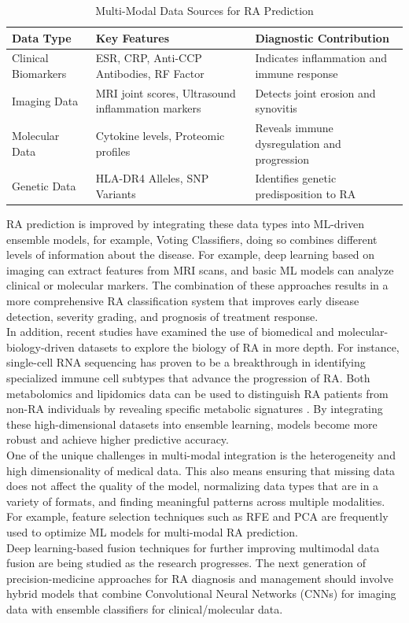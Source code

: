 \documentclass[10pt]{NSP1}
\begin{document}
	\begin{table}[H]
		\centering
		\caption{Multi-Modal Data Sources for RA Prediction}
		\renewcommand{\arraystretch}{1.2}
		\begin{tabular}{p{2.2cm}p{3cm}p{2.3cm}}
			\toprule
			\textbf{Data Type} & \textbf{Key Features} & \textbf{Diagnostic Contribution} \\
			\midrule
			Clinical Biomarkers & ESR, CRP, Anti-CCP Antibodies, RF Factor & Indicates inflammation and immune response \\
			Imaging Data & MRI joint scores, Ultrasound inflammation markers & Detects joint erosion and synovitis \\
			Molecular Data & Cytokine levels, Proteomic profiles & Reveals immune dysregulation and progression \\
			Genetic Data & HLA-DR4 Alleles, SNP Variants & Identifies genetic predisposition to RA \\
			\bottomrule
		\end{tabular}
		\label{tab:multimodal}
	\end{table}
	
	\noindent RA prediction is improved by integrating these data types into ML-driven ensemble models, for example, Voting Classifiers, doing so combines different levels of information about the disease. For example, deep learning based on imaging can extract features from MRI scans, and basic ML models can analyze clinical or molecular markers. The combination of these approaches results in a more comprehensive RA classification system that improves early disease detection, severity grading, and prognosis of treatment response.\\
	In addition, recent studies have examined the use of biomedical and molecular-biology-driven datasets to explore the biology of RA in more depth. For instance, single-cell RNA sequencing has proven to be a breakthrough in identifying specialized immune cell subtypes that advance the progression of RA. Both metabolomics and lipidomics data can be used to distinguish RA patients from non-RA individuals by revealing specific metabolic signatures \cite{kang2023multi}. By integrating these high-dimensional datasets into ensemble learning, models become more robust and achieve higher predictive accuracy.\\
	One of the unique challenges in multi-modal integration is the heterogeneity and high dimensionality of medical data. This also means ensuring that missing data does not affect the quality of the model, normalizing data types that are in a variety of formats, and finding meaningful patterns across multiple modalities. For example, feature selection techniques such as RFE and PCA are frequently used to optimize ML models for multi-modal RA prediction.\\
	Deep learning-based fusion techniques for further improving multimodal data fusion are being studied as the research progresses. The next generation of precision-medicine approaches for RA diagnosis and management should involve hybrid models that combine Convolutional Neural Networks (CNNs) for imaging data with ensemble classifiers for clinical/molecular data.
	
\end{document}
